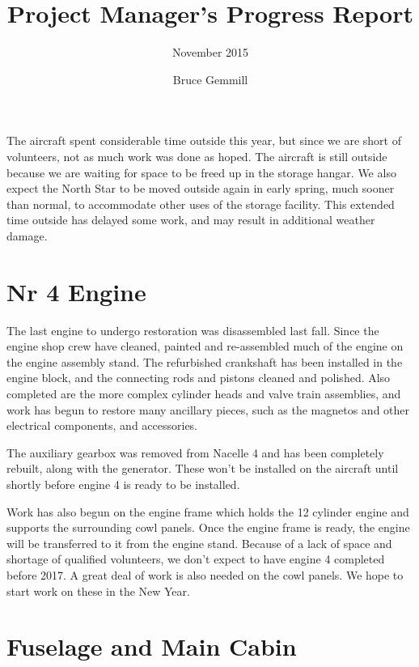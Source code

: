 %


\title{Project Manager's Progress Report}
\subtitle{November 2015}
\author{Bruce Gemmill}

\maketitle

The aircraft spent considerable time outside this year, but since we
are short of volunteers, not as much work was done as hoped.  The
aircraft is still outside because we are waiting for space to be freed
up in the storage hangar.  We also expect the North Star to be moved
outside again in early spring, much sooner than normal, to accommodate
other uses of the storage facility.  This extended time outside has
delayed some work, and may result in additional weather damage.

\section{Nr 4 Engine}
\label{sec:engine_4}

The last engine to undergo restoration was disassembled last fall.
Since the engine shop crew have cleaned, painted and re-assembled much
of the engine on the engine assembly stand. The refurbished crankshaft
has been installed in the engine block, and the connecting rods and
pistons cleaned and polished.  Also completed are the more complex
cylinder heads and valve train assemblies, and work has begun to
restore many ancillary pieces, such as the magnetos and other
electrical components, and accessories.

The auxiliary gearbox was removed from Nacelle 4 and has been
completely rebuilt, along with the generator.  These won’t be
installed on the aircraft until shortly before engine 4 is ready to be
installed.

Work has also begun on the engine frame which holds the 12 cylinder
engine and supports the surrounding cowl panels.  Once the engine
frame is ready, the engine will be transferred to it from the engine
stand.  Because of a lack of space and shortage of qualified
volunteers, we don’t expect to have engine 4 completed before 2017.  A
great deal of work is also needed on the cowl panels.  We hope to
start work on these in the New Year.

\section{Fuselage and Main Cabin}
\label{sec:main_cabin}

